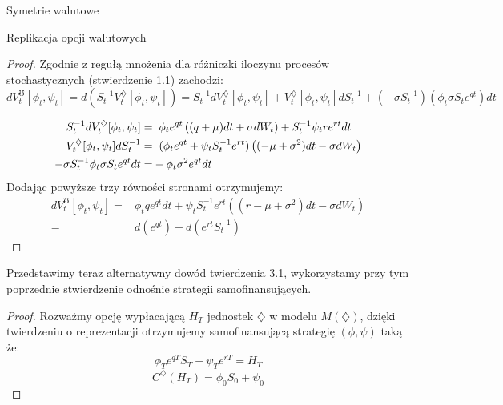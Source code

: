 \documentclass[11pt]{report}
\begin{document}
\begin{chapter}{Symetrie walutowe}
\begin{section}{Replikacja opcji walutowych}
\begin{proof}
Zgodnie z regułą mnożenia dla różniczki iloczynu procesów stochastycznych (stwierdzenie 1.1) zachodzi:
\begin{equation*}
dV_t^{\mho}[\phi_t, \psi_t] = d(S^{-1}_t V_t^{\diamondsuit}[\phi_t, \psi_t]) = S^{-1}_t dV_t^{\diamondsuit}[\phi_t, \psi_t] + V_t^{\diamondsuit}[\phi_t, \psi_t] d S^{-1}_t + (-\sigma S_t^{-1}) (\phi_t \sigma S_t e^{qt})dt
\end{equation*}




\begin{equation*}
\begin{split}
S^{-1}_t dV_t^{\diamondsuit}[\phi_t, \psi_t] = & \hspace{0.2cm}  \phi_t e^{qt} \left( (q+\mu)dt + \sigma d W_t \right) + S^{-1}_t \psi_t re^{rt}dt  \\
V_t^{\diamondsuit}[\phi_t, \psi_t] d S^{-1}_t = & \hspace{0.2cm} (\phi_t e^{qt} + \psi_t S^{-1}_t e^{rt}) \left( (-\mu+\sigma^2)dt - \sigma dW_t \right) \\
-\sigma S_t^{-1} \phi_t \sigma S_t e^{qt}dt = & - \phi_t \sigma^2 e^{qt}dt 
\end{split}
\end{equation*}
Dodając powyższe trzy równości stronami otrzymujemy:
\begin{equation*}
\begin{split}
dV_t^{\mho}[\phi_t, \psi_t] = & \phi_t qe^{qt}dt + \psi_t S^{-1}_t e^{rt} \left( (r - \mu + \sigma^2)dt - \sigma dW_t \right) \\ = & d(e^{qt}) + d(e^{rt} S^{-1}_t) 
\end{split}
\end{equation*}


\end{proof}


\end{section}
Przedstawimy teraz alternatywny dowód twierdzenia 3.1, wykorzystamy przy tym poprzednie stwierdzenie odnośnie strategii samofinansujących. \\
\begin{proof}
Rozważmy opcję wypłacającą $H_T$ jednostek $\diamondsuit$ w modelu $M(\diamondsuit)$, dzięki twierdzeniu o reprezentacji otrzymujemy samofinansującą strategię $(\phi, \psi)$ taką że:
\begin{equation*}
\phi_T e^{qT}S_T + \psi_T e^{rT} = H_T
\end{equation*} 
\begin{equation*}
C^{\diamondsuit}(H_T) = \phi_0 S_0 + \psi_0 
\end{equation*}


\end{proof}
\end{chapter}
\end{document}

